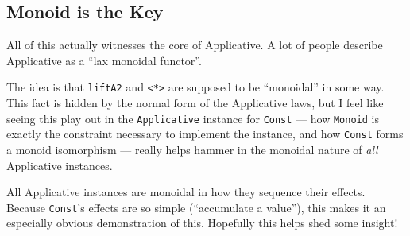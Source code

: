 \documentclass[]{article}
\begin{document}
\hypertarget{monoid-is-the-key}{%
\subsection{Monoid is the Key}\label{monoid-is-the-key}}

All of this actually witnesses the core of Applicative. A lot of people describe
Applicative as a ``lax monoidal functor''.

The idea is that \texttt{liftA2} and \texttt{\textless{}*\textgreater{}} are
supposed to be ``monoidal'' in some way. This fact is hidden by the normal form
of the Applicative laws, but I feel like seeing this play out in the
\texttt{Applicative} instance for \texttt{Const} --- how \texttt{Monoid} is
exactly the constraint necessary to implement the instance, and how
\texttt{Const} forms a monoid isomorphism --- really helps hammer in the
monoidal nature of \emph{all} Applicative instances.

All Applicative instances are monoidal in how they sequence their effects.
Because \texttt{Const}'s effects are so simple (``accumulate a value''), this
makes it an especially obvious demonstration of this. Hopefully this helps shed
some insight!
\end{document}
